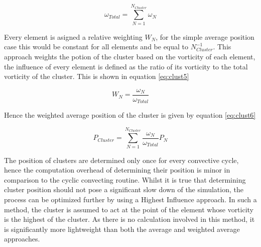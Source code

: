 \begin{equation}
\label{eq:clust4}
\omega_{Total}=\sum^{N_{Cluster}}_{N=1}\omega_{N}
\end{equation}

Every element is asigned a relative weighting $W_{N}$, for the simple average position case this would be constant for all elements and be equal to $N^{-1}_{Cluster}$. This approach weights the potion of the cluster based on the vorticity of each element, the influence of every element is defined as the ratio of its vorticity to the total vorticity of the cluster. This is shown in equation \ref{eq:clust5}

\begin{equation}
\label{eq:clust5}
W_{N}=\frac{\omega_N}{\omega_{Total}}
\end{equation}

Hence the weighted average position of the cluster is given by equation \ref{eq:clust6}

\begin{equation}
\label{eq:clust6}
P_{Cluster}=\sum^{N_{Cluster}}_{N=1}\frac{\omega_N}{\omega_{Total}}P_{N}
\end{equation}

The position of clusters are determined only once for every convective cycle, hence the computation overhead of determining their position is minor in comparison to the cyclic convecting routine. Whilst it is true that determining cluster position should not pose a significant slow down of the simulation, the process can be optimized further by using a Highest Influence approach. In such a method, the cluster is assumed to act at the point of the element whose vorticity is the highest of the cluster. As there is no calculation involved in this method, it is significantly more lightweight than both the average and weighted average approaches.







